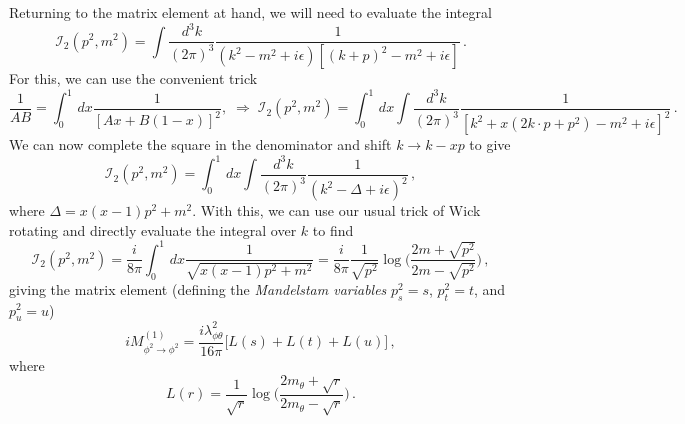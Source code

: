 \documentclass{article}
\numberwithin{equation}{subsection}
\begin{document}
Returning to the matrix element at hand, we will need to evaluate the integral
\begin{equation}
	\mathcal{I}_2(p^2, m^2) = \int\frac{d^3k}{(2\pi)^3}\frac{1}{(k^2 - m^2 + i\epsilon)[(k + p)^2 - m^2 + i\epsilon]}\,.
\end{equation}
For this, we can use the convenient trick
\begin{equation}
	\frac{1}{AB} = \int_0^1\,dx\frac{1}{[Ax + B(1 - x)]^2}, \; \Rightarrow \;
	\mathcal{I}_2(p^2, m^2) = \int_0^1\,dx\int\frac{d^3k}{(2\pi)^3}\frac{1}{[k^2 + x(2k\cdot p + p^2) - m^2 + i\epsilon]^2}\,.
\end{equation}
We can now complete the square in the denominator and shift $k\to k - xp$ to give
\begin{equation}
	\mathcal{I}_2(p^2, m^2) = \int_0^1\,dx\int\frac{d^3k}{(2\pi)^3}\frac{1}{(k^2 - \Delta + i\epsilon)^2}\,,
\end{equation}
where $\Delta = x(x-1)p^2 + m^2$. With this, we can use our usual trick of Wick rotating and directly evaluate the integral over $k$ to find
\begin{equation}
	\mathcal{I}_2(p^2, m^2) = \frac{i}{8\pi}\int_0^1\,dx\frac{1}{\sqrt{x(x-1)p^2 + m^2}} 
		= \frac{i}{8\pi}\frac{1}{\sqrt{p^2}}\log\Bigg(\frac{2m + \sqrt{p^2}}{2m - \sqrt{p^2}}\Bigg)\,,
\end{equation}
giving the matrix element (defining the \textit{Mandelstam variables} $p_s^2 = s$, $p_t^2 = t$, and $p_u^2 = u$)
\begin{equation}
	iM^{(1)}_{\phi^2\to\phi^2} = \frac{i\lambda_{\phi\theta}^2}{16\pi}\big[L(s) + L(t) + L(u)\big]\,,
\end{equation}
where
\begin{equation}\label{eq:logfun}
	L(r) = \frac{1}{\sqrt{r}}\log\Bigg(\frac{2m_\theta + \sqrt{r}}{2m_\theta - \sqrt{r}}\Bigg)\,.
\end{equation}
\end{document}
